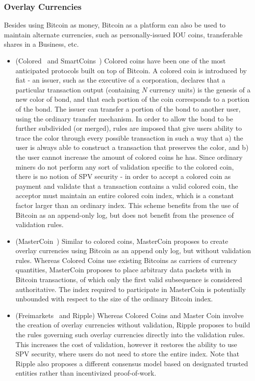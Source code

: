 \subsubsection{Overlay Currencies}
Besides using Bitcoin as money, Bitcoin as a platform can also be used to maintain alternate currencies, such as personally-issued IOU coins, transferable shares in a Business, etc.
\begin{itemize}
\item (Colored~\cite{coloredcoins,bitcointalk-coloredcoins} and SmartCoins~\cite{jgarzik-smartcoin}) Colored coins have been one of the most anticipated protocols built on top of Bitcoin. A colored coin is introduced by fiat - an issuer, such as the executive of a corporation, declares that a particular transaction output (containing $N$ currency units) is the genesis of a new color of bond, and that each portion of the coin corresponds to a portion of the bond. The issuer can transfer a portion of the bond to another user, using the ordinary transfer mechanism. In order to allow the bond to be further subdivided (or merged), rules are imposed that give users ability to trace the color through every possible transaction in such a way that a) the user is always able to construct a transaction that preserves the color, and b) the user cannot increase the amount of colored coins he has. Since ordinary miners do not perform any sort of validation specific to the colored coin, there is no notion of SPV security - in order to accept a colored coin as payment and validate that a transaction contains a valid colored coin, the acceptor must maintain an entire colored coin index, which is a constant factor larger than an ordinary index. This scheme benefits from the use of Bitcoin as an append-only log, but does not benefit from the presence of validation rules.
\item (MasterCoin~\cite{mastercoin}) Similar to colored coins, MasterCoin proposes to create overlay currencies using Bitcoin as an append only log, but without validation rules. Whereas Colored Coins use existing Bitcoins as carriers of currency quantities, MasterCoin proposes to place arbitrary data packets with in Bitcoin transactions, of which only the first valid subsequence is considered authoritative. The index required to participate in MasterCoin is potentially unbounded with respect to the size of the ordinary Bitcoin index.
\item (Freimarkets~\cite{freimarkets} and Ripple) Whereas Colored Coins and Master Coin involve the creation of overlay currencies without validation, Ripple proposes to build the rules governing such overlay currencies directly into the validation rules. This increases the cost of validation, however it restores the ability to use SPV security, where users do not need to store the entire index. Note that Ripple also proposes a different consensus model based on designated trusted entities rather than incentivized proof-of-work.
\end{itemize}

